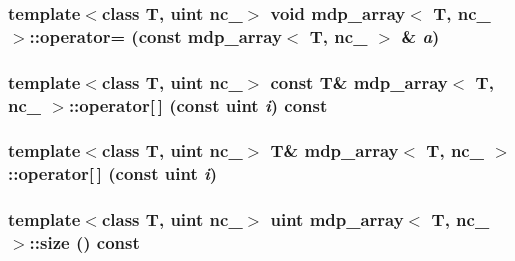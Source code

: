 \label{classmdp__array_a9e3a7e699387fb78562fb8d9c9ebea57}
\hypertarget{classmdp__array_a8f439abc20da235f12cd5d0ab4d7b56b}{
\subsubsection[{operator=}]{\setlength{\rightskip}{0pt plus 5cm}template$<$class T, uint nc\_\-$>$ void {\bf mdp\_\-array}$<$ T, nc\_\- $>$::operator= (const {\bf mdp\_\-array}$<$ T, nc\_\- $>$ \& {\em a})}}
\label{classmdp__array_a8f439abc20da235f12cd5d0ab4d7b56b}
\hypertarget{classmdp__array_a7c6f82ec888e82f3743529ac25d42627}{
\subsubsection[{operator[]}]{\setlength{\rightskip}{0pt plus 5cm}template$<$class T, uint nc\_\-$>$ const T\& {\bf mdp\_\-array}$<$ T, nc\_\- $>$::operator\mbox{[}$\,$\mbox{]} (const {\bf uint} {\em i}) const}}
\label{classmdp__array_a7c6f82ec888e82f3743529ac25d42627}
\hypertarget{classmdp__array_acc0201400e730c01bd131696ff206aa6}{
\subsubsection[{operator[]}]{\setlength{\rightskip}{0pt plus 5cm}template$<$class T, uint nc\_\-$>$ T\& {\bf mdp\_\-array}$<$ T, nc\_\- $>$::operator\mbox{[}$\,$\mbox{]} (const {\bf uint} {\em i})}}
\label{classmdp__array_acc0201400e730c01bd131696ff206aa6}
\hypertarget{classmdp__array_a236c3497ad1e959070836746302448e8}{
\subsubsection[{size}]{\setlength{\rightskip}{0pt plus 5cm}template$<$class T, uint nc\_\-$>$ {\bf uint} {\bf mdp\_\-array}$<$ T, nc\_\- $>$::size () const}}
